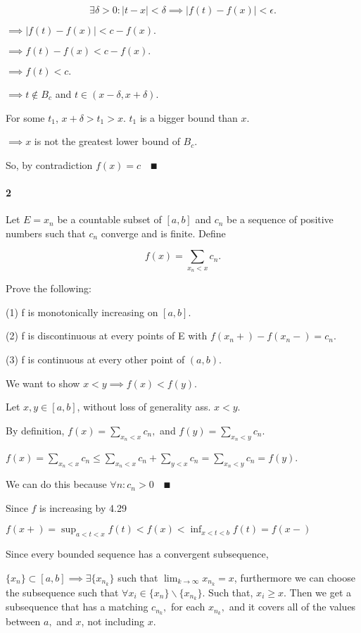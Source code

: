 \documentclass{article}
\begin{document}
\[\exists \delta > 0: |t - x | < \delta \implies |f(t) - f(x)| <
  \epsilon.\]

$\implies  |f(t) - f(x)| < c - f(x).$

$\implies  f(t) - f(x) < c - f(x).$

$\implies  f(t) < c.$

$\implies t \not \in B_c$ and $t\in (x-\delta , x +\delta).$

For some $t_1$, $x+\delta > t_1 > x$. $t_1$ is a bigger bound than
$x$.

$\implies x$ is not the greatest lower bound of $B_c.$

So, by contradiction $f(x) = c\quad ∎$

\paragraph{2} Let $E = {x_n }$ be a countable subset of $[a, b]$ and
${c_n}$ be a sequence of positive numbers such that
$c_n$ converge and is finite. Define

\[f (x) =\sum_{x_n < x} c_n.\]

Prove the following:

(1) f is monotonically increasing on $[a, b]$.

(2) f is discontinuous at every points of E with
$f (x_n +) − f (x_n −) = c_n $.

(3) f is continuous at every other point of $(a, b)$.


We want to show $x<y \implies f(x) < f(y).$

Let $x,y \in [a,b]$, without loss of generality ass. $x<y$.

By definition, $f(x) =\sum_{x_n < x} c_n,$ and $f(y) =\sum_{x_n < y}
c_n.$

$f(x) = \sum_{x_n < x} c_n \leq \sum_{x_n < x} c_n + \sum_{y < x} c_n
= \sum_{x_n < y} c_n = f(y)$.

We can do this because $\forall n: c_n > 0 \quad ∎$


Since $f$ is increasing by 4.29

$f(x+)= \sup_{a<t<x} f(t) < f(x) < \inf_{x<t<b} f(t) = f(x-)$

Since every bounded sequence has a convergent subsequence,

$\{x_n\} \subset [a,b] \implies \exists \{x_{n_k}\}$ such that
$\lim_{k\rightarrow \infty} x_{n_k} = x$, furthermore we can choose
the subsequence such that $\forall x_i \in \{x_n\} \backslash
\{x_{n_k}\}.$ Such that, $ x_i \geq x.$ Then we get a subsequence that
has a matching $c_{n_k},$ for each $x_{n_k},$ and it covers all of the
values between $a,$ and $x$, not including $x$.
\end{document}
